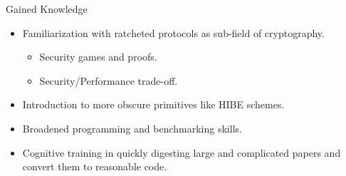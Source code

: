 \documentclass{beamer}
\begin{document}
\begin{frame}{Gained Knowledge}
  \begin{itemize}
  \item Familiarization with ratcheted protocols as sub-field of cryptography.
    \begin{itemize}
    \item Security games and proofs.
    \item Security/Performance trade-off.
    \end{itemize}
  \item Introduction to more obscure primitives like HIBE schemes.
  \item Broadened programming and benchmarking skills.
  \item Cognitive training in quickly digesting large and complicated
    papers and convert them to reasonable code.
  \end{itemize}
\end{frame}
\end{document}
